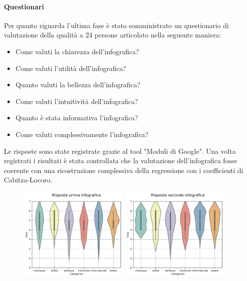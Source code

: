 \documentclass[10pt, a4paper,openany]{article}
\begin{document}
\paragraph{Questionari} Per quanto riguarda l'ultima fase è stato somministrato un questionario di valutazione della qualità a 24 persone articolato nella seguente maniera:
\begin{itemize}
	\item Come valuti la chiarezza dell'infografica?
	\item Come valuti l'utilità dell'infografica?
	\item Quanto valuti la bellezza dell'infografica?
	\item Come valuti l'intuitività dell'infografica?
	\item Quanto è stata informativa l'infografica?
	\item Come valuti complessivamente l'infografica?
\end{itemize}
Le risposte sono state registrate grazie al tool "Moduli di Google". Una volta registrati i risultati è stata controllata che la valutazione dell'infografica fosse coerente con una ricostruzione complessiva della regressione con i coefficienti di Cabitza-Locoro.
\begin{figure}[H]
   \includegraphics[width=0.475\textwidth]{../quality/risposte_violin_plot_first.png}
   \hfill
   \includegraphics[width=0.475\textwidth]{../quality/risposte_violin_plot_second.png}
\end{figure}
\end{document}
